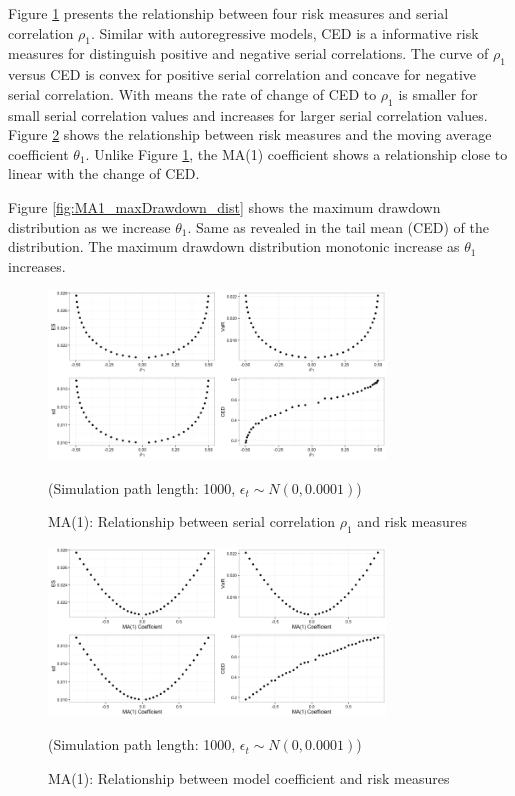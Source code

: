 \documentclass[11pt]{article}
\begin{document}
Figure \ref{fig:MA1_risk_measures_acf1} presents the relationship between four risk measures and serial correlation $\rho_1$. Similar with autoregressive models, CED is a informative risk measures for distinguish positive and negative serial correlations. The curve of $\rho_1$ versus CED is convex for positive serial correlation and concave for negative serial correlation. With means the rate of change of CED to $\rho_1$ is smaller for small serial correlation values and increases for larger serial correlation values. Figure \ref{fig:MA1_risk_measures_coefficient} shows the relationship between risk measures and the moving average coefficient $\theta_1$. Unlike Figure \ref{fig:MA1_risk_measures_acf1}, the MA(1) coefficient shows a relationship close to linear with the change of CED.

Figure \ref{fig:MA1_maxDrawdown_dist} shows the maximum drawdown distribution as we increase $\theta_1$. Same as revealed in the tail mean (CED) of the distribution. The maximum drawdown distribution monotonic increase as $\theta_1$ increases.

\begin{figure}[H]
\centering
\includegraphics[width = 0.8\textwidth]{../figures/simulation/MA1_risk_measures_acf1}
\caption{MA(1): Relationship between serial correlation $\rho_1$ and risk measures}
(Simulation path length: 1000, $\epsilon_t \sim N(0, 0.0001)$)
\label{fig:MA1_risk_measures_acf1}
\end{figure}

\begin{figure}[H]
\centering
\includegraphics[width = 0.8\textwidth]{../figures/simulation/MA1_risk_measures_coefficient}
\caption{MA(1): Relationship between model coefficient and risk measures}
(Simulation path length: 1000, $\epsilon_t \sim N(0, 0.0001)$)
\label{fig:MA1_risk_measures_coefficient}
\end{figure} 
\end{document}
